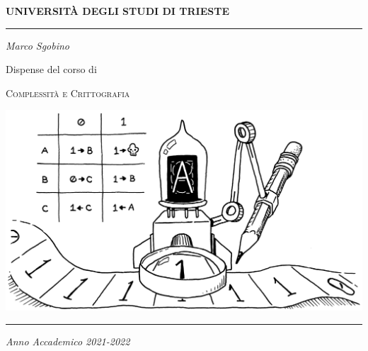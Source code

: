 \begin{titlepage}
        \begin{center}
                \Large
                \textbf{UNIVERSITÀ DEGLI STUDI DI TRIESTE}

                \par\noindent\rule{\textwidth}{0.8pt}
                \vspace*{0.6cm}

                \large
                \emph{Marco Sgobino}

                \large
                \vspace*{0.6cm}

                \Large Dispense del corso di
                \vspace*{0.6cm}

                \Huge
                \textsc{Complessità e Crittografia}
                \vspace*{.1cm}


                \vspace*{2cm}

                \begin{center}
                        \includegraphics[width=.9\textwidth, keepaspectratio]{./pics/turing-machine-titlepage.png}
                \end{center}

                \vfill

                \par\noindent\rule{\textwidth}{0.8pt}
                \vspace*{0.6cm}
                \large
                \emph{Anno Accademico 2021-2022}

        \end{center}
\end{titlepage}

